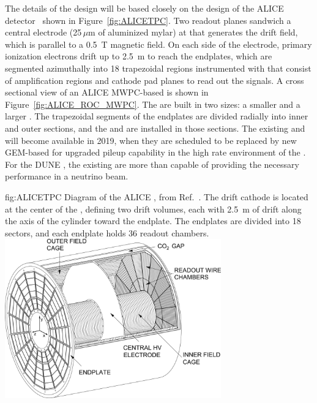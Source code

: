 The details of the  design will be based closely on the design of the ALICE detector~\cite{Dellacasa:2000bm} shown in Figure~\ref{fig:ALICETPC}. Two readout planes sandwich a central  electrode (25$\,\mu$m of aluminized mylar) at  that generates the drift field, which is parallel to a \SI{0.5}{T} magnetic field. On each side of the electrode, primary ionization electrons drift up to \SI{2.5}{m} to reach the endplates, which are segmented azimuthally into 18 trapezoidal regions instrumented with  that consist of  amplification regions and cathode pad planes to read out the signals. A cross sectional view of an ALICE MWPC-based  is shown in Figure~\ref{fig:ALICE_ROC_MWPC}. The  are built in two sizes: a smaller  and a larger . The trapezoidal segments of the endplates are divided radially into inner and outer sections, and the  and  are installed in those sections. The existing  and  will become available in 2019, when they are scheduled to be replaced by new GEM-based  for upgraded pileup capability in the high rate environment of the . For the DUNE , the existing  are more than capable of providing the necessary performance in a neutrino beam.  

\begin{dunefigure}{fig:ALICETPC}
{Diagram of the ALICE , from Ref.~\cite{Alme:2010ke}. The drift  cathode is located at the center of the , defining two drift volumes, each with \SI{2.5}{m} of drift along the axis of the cylinder toward the endplate. The endplates are divided into 18 sectors, and each endplate holds 36 readout chambers.}
    \includegraphics[width=0.7\textwidth]{graphics/alice_tpc_highres.jpg}
\end{dunefigure}


